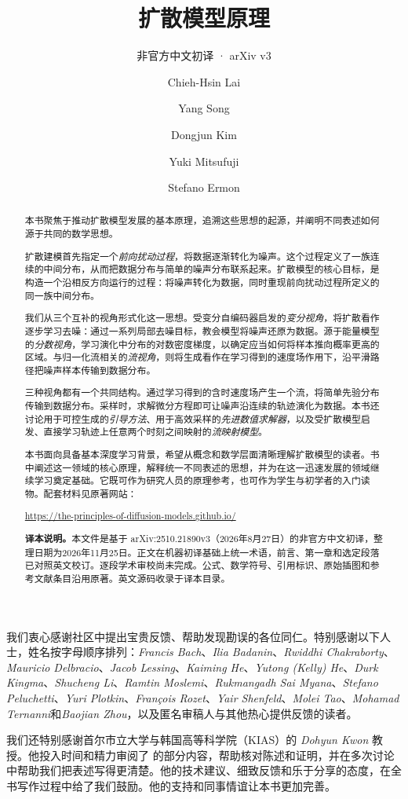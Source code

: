 \documentclass[examplefnt,biber]{nowfnt-arxiv}
\title{扩散模型原理}
\subtitle{非官方中文初译 · arXiv v3}
\author[1]{Chieh-Hsin Lai}
\author[2]{Yang Song}
\author[3]{Dongjun Kim}
\author[4]{Yuki Mitsufuji}
\author[5]{Stefano Ermon}
\affil[1]{Sony AI; \url{chieh-hsin.lai@sony.com} / \url{chiehhsinlai@gmail.com}}
\affil[2]{OpenAI\footnote{单位信息为开展本工作时的所属机构。}; \url{thusongyang@gmail.com}}
\affil[3]{Stanford University; \url{dongjun@stanford.edu}}
\affil[4]{Sony Group Corporation, Sony AI; \url{yuhki.mitsufuji@sony.com}}
\affil[5]{Stanford University; \url{ermon@cs.stanford.edu}}
\newtheorem[M]{question}{\sffamily\bfseries Question}[section]
\begin{document}
\makeabstracttitle


\begin{abstract}
本书聚焦于推动扩散模型发展的基本原理，追溯这些思想的起源，并阐明不同表述如何源于共同的数学思想。

扩散建模首先指定一个\emph{前向扰动过程}，将数据逐渐转化为噪声。这个过程定义了一族连续的中间分布，从而把数据分布与简单的噪声分布联系起来。扩散模型的核心目标，是构造一个沿相反方向运行的过程：将噪声转化为数据，同时重现前向扰动过程所定义的同一族中间分布。

我们从三个互补的视角形式化这一思想。受变分自编码器启发的\emph{变分视角}，将扩散看作逐步学习去噪：通过一系列局部去噪目标，教会模型将噪声还原为数据。源于能量模型的\emph{分数视角}，学习演化中分布的对数密度梯度，以确定应当如何将样本推向概率更高的区域。与归一化流相关的\emph{流视角}，则将生成看作在学习得到的速度场作用下，沿平滑路径把噪声样本传输到数据分布。

三种视角都有一个共同结构。通过学习得到的含时速度场产生一个流，将简单先验分布传输到数据分布。采样时，求解微分方程即可让噪声沿连续的轨迹演化为数据。本书还讨论用于可控生成的\emph{引导方法}、用于高效采样的\emph{先进数值求解器}，以及受扩散模型启发、直接学习轨迹上任意两个时刻之间映射的\emph{流映射模型}。

本书面向具备基本深度学习背景，希望从概念和数学层面清晰理解扩散模型的读者。书中阐述这一领域的核心原理，解释统一不同表述的思想，并为在这一迅速发展的领域继续学习奠定基础。它既可作为研究人员的原理参考，也可作为学生与初学者的入门读物。配套材料见原著网站：
{\centering\url{https://the-principles-of-diffusion-models.github.io/}\par}

\medskip
\noindent\textbf{译本说明。}本文件是基于 arXiv:2510.21890v3（2026年8月27日）的非官方中文初译，整理日期为2026年11月25日。正文在机器初译基础上统一术语，前言、第一章和选定段落已对照英文校订。逐段学术审校尚未完成。公式、数学符号、引用标识、原始插图和参考文献条目沿用原著。英文源码收录于译本目录。
\end{abstract}

\begin{acknowledgements}
我们衷心感谢社区中提出宝贵反馈、帮助发现勘误的各位同仁。特别感谢以下人士，姓名按字母顺序排列：\emph{Francis Bach}、\emph{Ilia Badanin}、\emph{Rwiddhi Chakraborty}、\emph{Mauricio Delbracio}、\emph{Jacob Lessing}、\emph{Kaiming He}、\emph{Yutong (Kelly) He}、\emph{Durk Kingma}、\emph{Shucheng Li}、\emph{Ramtin Moslemi}、\emph{Rukmangadh Sai Myana}、\emph{Stefano Peluchetti}、\emph{Yuri Plotkin}、\emph{François Rozet}、\emph{Yair Shenfeld}、\emph{Molei Tao}、\emph{Mohamad Ternanni}和\emph{Baojian Zhou}，以及匿名审稿人与其他热心提供反馈的读者。

我们还特别感谢首尔市立大学与韩国高等科学院（KIAS）的 \emph{Dohyun Kwon} 教授。他投入时间和精力审阅了  的部分内容，帮助核对陈述和证明，并在多次讨论中帮助我们把表述写得更清楚。他的技术建议、细致反馈和乐于分享的态度，在全书写作过程中给了我们鼓励。他的支持和同事情谊让本书更加完善。
\end{acknowledgements}
\end{document}
